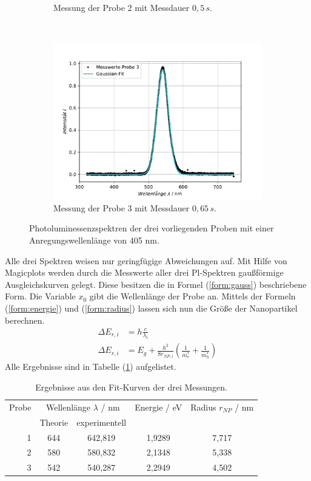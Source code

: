 \begin{figure}[H]
\begin{subfigure}[t]{0.4\textwidth}
	\caption{Messung der Probe 2 mit Messdauer $0,5 \, s$.}
	\label{abb:A1_P2}
	\end{subfigure}
	~
	\begin{subfigure}[t]{0.4\textwidth}
	\includegraphics[width=\textwidth]{Plots/aufgabe1a_P3.pdf}
	\caption{Messung der Probe 3 mit Messdauer $0,65 \, s$.}
	\label{abb:A1_P3}
	\end{subfigure}
\caption{Photoluminessenzspektren der drei vorliegenden Proben mit einer Anregungswellenl\"{a}nge von 405 nm.}
\label{abb:auf1a}
\end{figure}
Alle drei Spektren weisen nur geringf\"{u}gige Abweichungen auf.
Mit Hilfe von Magicplots werden durch die Messwerte aller drei Pl-Spektren gau{\ss}f\"{o}rmige Ausgleichskurven gelegt.
Diese besitzen die in Formel (\ref{form:gauss}) beschriebene Form.
Die Variable $x_0$ gibt die Wellenl\"{a}nge der Probe an.
Mittels der Formeln (\ref{form:energie}) und (\ref{form:radius}) lassen sich nun die Gr\"{o}{\ss}e der Nanopartikel berechnen.
\begin{align}
	\Delta E_{r,i} &= h \frac{c}{\lambda_i} \label{form:energie}\\
	\Delta E_{r,i} &= E_g + \frac{h^2}{8r_{NP,i}} \left( \frac{1}{m_e^*} + \frac{1}{m_h^*} \right) \label{form:radius}
\end{align}
Alle Ergebnisse sind in Tabelle (\ref{tab:auf1a}) aufgelistet.
\begin{table}
	\centering
	\caption{Ergebnisse aus den Fit-Kurven der drei Messungen.}
\begin{tabular}{|r|cccc|}
	\hline
	{Probe} & \multicolumn{2}{c}{Wellenl\"{a}nge $\lambda$ / nm} & {Energie / eV} & {Radius $r_{NP}$ / nm} \\
	 & Theorie & experimentell &  &  \\
	\hline
	1	&	644	& 642,819 &	1,9289	&	7,717	\\
	2	&	580	& 580,832 &	2,1348	&	5,338	\\
	3	&	542	& 540,287 &	2,2949	&	4,502	\\
	\hline
\end{tabular}
\label{tab:auf1a}
\end{table}

